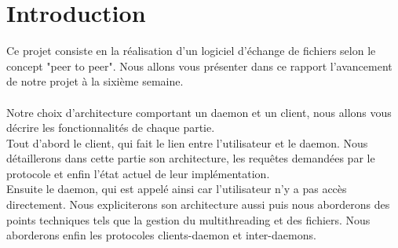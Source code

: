 \chapter{Introduction}
Ce projet consiste en la réalisation d'un logiciel d'échange de fichiers selon
le concept "peer to peer". Nous allons vous présenter dans ce rapport 
l'avancement de notre projet à la sixième semaine.\\
\\
Notre choix d'architecture comportant un daemon et un client, nous allons vous
décrire les fonctionnalités de chaque partie.\\
Tout d'abord le client, qui fait le lien entre l'utilisateur et le daemon. Nous
détaillerons dans cette partie son architecture, les requêtes demandées par le
protocole et enfin l'état actuel de leur implémentation.\\
Ensuite le daemon, qui est appelé ainsi car l'utilisateur n'y a pas accès
directement.
Nous expliciterons son architecture aussi puis nous aborderons des points 
techniques tels que la gestion du multithreading et des fichiers. Nous 
aborderons enfin les protocoles clients-daemon et inter-daemons.
